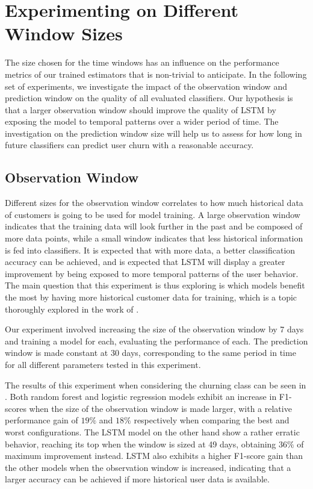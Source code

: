 \documentclass{kththesis}
\begin{document}
\section{Experimenting on Different Window Sizes}

The size chosen for the time windows has an influence on the performance metrics of our trained estimators that is non-trivial to anticipate. In the following set of experiments, we investigate the impact of the observation window and prediction window on the quality of all evaluated classifiers. Our hypothesis is that a larger observation window should improve the quality of LSTM by exposing the model to temporal patterns over a wider period of time. The investigation on the prediction window size will help us to assess for how long in future classifiers can predict user churn with a reasonable accuracy. 

\subsection{Observation Window}
\label{sec:exp_obs_window}

Different sizes for the observation window correlates to how much historical data of customers is going to be used for model training. A large observation window indicates that the training data will look further in the past and be composed of more data points, while a small window indicates that less historical information is fed into classifiers. It is expected that with more data, a better classification accuracy can be achieved, and is expected that LSTM will display a greater improvement by being exposed to more temporal patterns of the user behavior. The main question that this experiment is thus exploring is which models benefit the most by having more historical customer data for training, which is a topic thoroughly explored in the work of \citep{Ballings2012}.

Our experiment involved increasing the size of the observation window by 7 days and training a model for each, evaluating the performance of each. The prediction window is made constant at 30 days, corresponding to the same period in time for all different parameters tested in this experiment. 

The results of this experiment when considering the churning class can be seen in . Both random forest and logistic regression models exhibit an increase in F1-scores when the size of the observation window is made larger, with a relative performance gain of $19\%$ and $18\%$ respectively when comparing the best and worst configurations. The LSTM model on the other hand show a rather erratic behavior, reaching its top when the window is sized at 49 days, obtaining $36\%$ of maximum improvement instead. LSTM also exhibits a higher F1-score gain than the other models when the observation window is increased, indicating that a larger accuracy can be achieved if more historical user data is available. 
\end{document}
